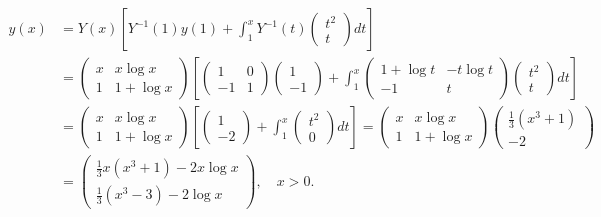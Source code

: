 \documentclass[11pt,a4paper,twoside]{book}
\begin{document}
\begin{align*}
y(x) &= Y(x) \left[ Y^{-1}(1)y(1) + \int_1^x Y^{-1}(t) \begin{pmatrix} t^2 \\ t \end{pmatrix} dt \right] \\
&= \begin{pmatrix} x & x\log x \\ 1 & 1+\log x \end{pmatrix} \left[ \begin{pmatrix} 1 & 0 \\ -1 & 1 \end{pmatrix} \begin{pmatrix} 1 \\ -1 \end{pmatrix} + \int_1^x \begin{pmatrix} 1+\log t & -t\log t \\ -1 & t \end{pmatrix} \begin{pmatrix} t^2 \\ t \end{pmatrix} dt \right] \\
&= \begin{pmatrix} x & x\log x \\ 1 & 1+\log x \end{pmatrix} \left[ \begin{pmatrix} 1 \\ -2 \end{pmatrix} + \int_1^x \begin{pmatrix} t^2 \\ 0 \end{pmatrix} dt \right] = \begin{pmatrix} x & x\log x \\ 1 & 1+\log x \end{pmatrix} \begin{pmatrix} \frac{1}{3}(x^3+1) \\ -2 \end{pmatrix} \\
&= \begin{pmatrix} \frac{1}{3}x(x^3+1)-2x\log x \\ \frac{1}{3}(x^3-3)-2\log x \end{pmatrix}, \quad x>0.
\end{align*}
\end{document}
